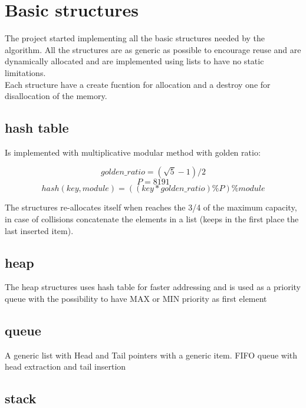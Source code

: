 \section{Basic structures}
\label{Sec:basic_structures}

The project started implementing all the basic structures needed by the algorithm. All the structures are as generic as possible to encourage reuse and are dynamically allocated and are implemented using lists to have no static limitations. \\
Each structure have a create fucntion for allocation and a destroy one for disallocation of the memory.

\subsection{hash table}

Is implemented with multiplicative modular method with golden ratio:

\begin{equation}
    golden\_ratio = (\sqrt{5} - 1)/2
\end{equation}
\begin{equation}
    P = 8191
\end{equation}
\begin{equation}
    hash(key, module) = ((key*golden\_ratio)\%P)\%module
\end{equation}

The structures re-allocates itself when reaches the 3/4 of the maximum capacity, in case of collisions concatenate the elements in a list (keeps in the first place the last inserted item).

\subsection{heap}

The heap structures uses hash table for faster addressing and is used as a priority queue with the possibility to have MAX or MIN priority as first element

\subsection{queue}

A generic list with Head and Tail pointers with a generic item. FIFO queue with head extraction and tail insertion

\subsection{stack}

